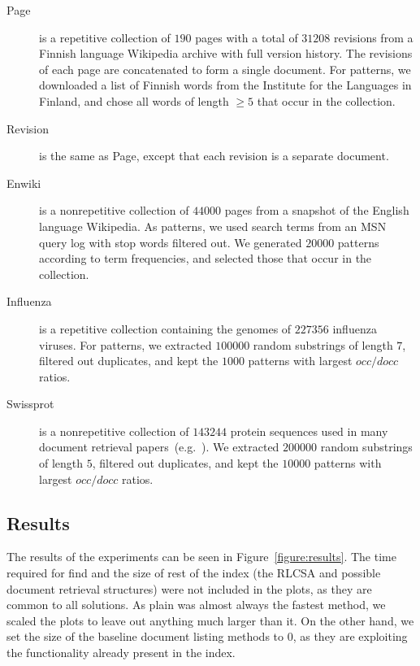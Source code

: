 \documentclass[11pt]{llncs}
\newcommand{\find}{\textsf{find}}
\newcommand{\Enwiki}{\textsf{Enwiki}}
\newcommand{\Page}{\textsf{Page}}
\newcommand{\Revision}{\textsf{Revision}}
\newcommand{\Influenza}{\textsf{Influenza}}
\newcommand{\Swissprot}{\textsf{Swissprot}}
\begin{document}
\begin{description}
\item[\Page{}] is a repetitive collection of $190$ pages with a total of $31208$ revisions from a Finnish language Wikipedia archive with full version history. The revisions of each page are concatenated to form a single document. For patterns, we downloaded a list of Finnish words from the Institute for the Languages in Finland, and chose all words of length $\ge 5$ that occur in the collection.

\item[\Revision{}] is the same as \Page, except that each revision is a separate document.

\item[\Enwiki{}] is a nonrepetitive collection of $44000$ pages from a snapshot of the English language Wikipedia. As patterns, we used search terms from an MSN query log with stop words filtered out. We generated $20000$ patterns according to term frequencies, and selected those that occur in the collection.

\item[\Influenza{}] is a repetitive collection containing the genomes of $227356$ influenza viruses. For patterns, we extracted $100000$ random substrings of length $7$, filtered out duplicates, and kept the $1000$ patterns with largest $occ/docc$ ratios.

\item[\Swissprot{}] is a nonrepetitive collection of $143244$ protein sequences used in many document retrieval papers~(e.g.~\cite{NV12}). We extracted $200000$ random substrings of length $5$, filtered out duplicates, and kept the $10000$ patterns with largest $occ/docc$ ratios.
\end{description}

\subsection{Results}

The results of the experiments can be seen in Figure~\ref{figure:results}. The
time required for \find{} and the size of rest of the index (the RLCSA and possible document retrieval structures) were not included in the plots, as they are common to all solutions. As plain \sada{} was almost always the fastest method, we scaled the plots to leave out anything much larger than it. On the other hand, we set the size of the baseline document listing methods to $0$, as they are exploiting the functionality already present in the index.
\end{document}
